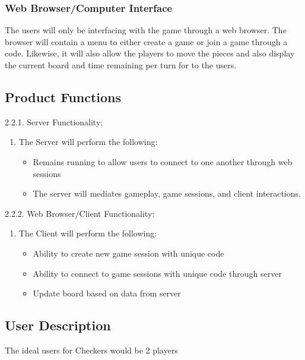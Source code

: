 \documentclass[10pt]{article}
\begin{document}
\subsubsection{Web Browser/Computer Interface}
\indent \indent The users will only be interfacing with the game through a web browser. The browser will contain a menu to either create a game or join a game through a code. Likewise, it will also allow the players to move the pieces and also display the current board and time remaining per turn for to the users.

\subsection{Product Functions}

\begin{flushleft}
    {\large 2.2.1. Server Functionality:}
        {\begin{enumerate}
            \item The Server will perform the following:
            \begin{itemize}
                \item Remains running to allow users to connect to one another through web sessions
                \item The server will mediates gameplay, game sessions, and client interactions.
            \end{itemize}
        \end{enumerate}}
\end{flushleft}

\begin{flushleft}
    {\large 2.2.2. Web Browser/Client Functionality:}
        {\begin{enumerate}
            \item The Client will perform the following:
            \begin{itemize}
                \item Ability to create new game session with unique code
                \item Ability to connect to game sessions with unique code through server
                \item Update board based on data from server
            \end{itemize}    
    \end{enumerate}}
\end{flushleft}

\subsection{User Description}
The ideal users for Checkers would be 2 players 
\end{document}
